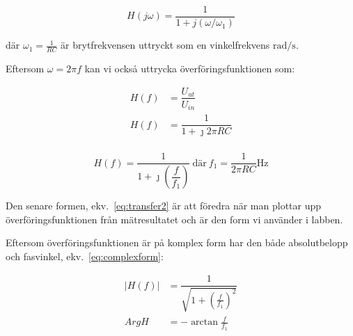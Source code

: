 \begin{equation}\label{eq:transfer}
  H(j\omega) = \dfrac{1}{1+j(\omega/\omega_1)}
\end{equation}

där $\omega_1 = \tfrac{1}{R C}$ är brytfrekvensen uttryckt som en
vinkelfrekvens $\si{\radian\per\second}$.


\par
Eftersom $\omega = 2 \pi f$ kan vi också uttrycka överföringsfunktionen som:

\begin{equation*}
  \begin{split}
    H(f) &= \dfrac{U_{ut}}{U_{in}}        \\
    H(f) &= \dfrac{1}{1+\jmath 2 \pi R C} \\
  \end{split}
\end{equation*}

\begin{equation}\label{eq:transfer2}
  H(f) = \dfrac{1}{1+\jmath (\dfrac{f}{f_1})}\
  \text{där}\ f_1 = \dfrac{1}{2 \pi R C} \si{\Hz}
\end{equation}


\par Den senare formen, ekv.~\eqref{eq:transfer2} är att föredra när man
plottar upp överföringsfunktionen från mätresultatet och är den form vi
använder i labben.

Eftersom överföringsfunktionen är på komplex form har den både absolutbelopp
och fasvinkel, ekv.~\eqref{eq:complexform}:

\begin{equation}\label{eq:complexform}
  \begin{split}
    |H(f)| &= \dfrac{1}{\sqrt{1+{(\frac{f}{f_1})}^2}} \\
      ArgH &= -\arctan{\frac{f}{f_1}}
  \end{split}
\end{equation}



